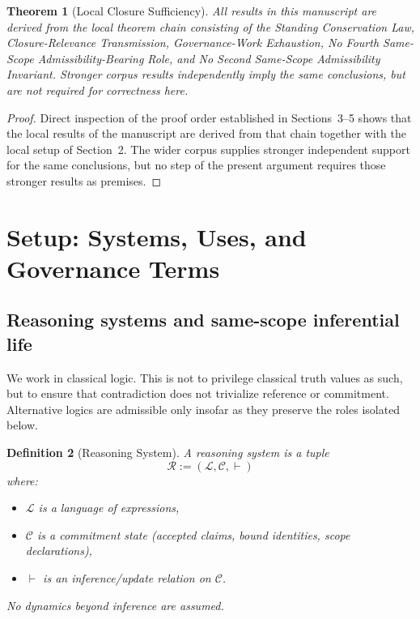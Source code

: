 \documentclass[11pt]{article}
\newtheorem{theorem}{Theorem}[section]
\newtheorem{definition}[theorem]{Definition}
\begin{document}
\begin{theorem}[Local Closure Sufficiency]
\label{thm:localsuff}
All results in this manuscript are derived from the local theorem chain consisting of the Standing Conservation Law, Closure-Relevance Transmission, Governance-Work Exhaustion, No Fourth Same-Scope Admissibility-Bearing Role, and No Second Same-Scope Admissibility Invariant. Stronger corpus results independently imply the same conclusions, but are not required for correctness here.
\end{theorem}

\begin{proof}
Direct inspection of the proof order established in Sections~3--5 shows that the local results of the manuscript are derived from that chain together with the local setup of Section~2. The wider corpus supplies stronger independent support for the same conclusions, but no step of the present argument requires those stronger results as premises.
\end{proof}

\section{Setup: Systems, Uses, and Governance Terms}

\subsection{Reasoning systems and same-scope inferential life}

We work in classical logic. This is not to privilege classical truth values as such, but to ensure that contradiction does not trivialize reference or commitment. Alternative logics are admissible only insofar as they preserve the roles isolated below.

\begin{definition}[Reasoning System]
A \emph{reasoning system} is a tuple
\[
\mathcal{R} := (\mathcal{L},\mathcal{C},\vdash)
\]
where:
\begin{itemize}
\item $\mathcal{L}$ is a language of expressions,
\item $\mathcal{C}$ is a commitment state (accepted claims, bound identities, scope declarations),
\item $\vdash$ is an inference/update relation on $\mathcal{C}$.
\end{itemize}
No dynamics beyond inference are assumed.
\end{definition}
\end{document}
